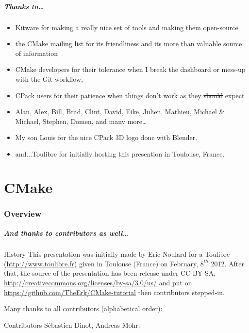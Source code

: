 \documentclass[compress,slidestop,table
              ]
               {beamer}
\begin{document}
\begin{frame}
\frametitle{Thanks to\ldots}
\begin{itemize}
\item \textcolor{cmakeblue}{Kitware for making a really nice set of tools and making them open-source}
\item \textcolor{cmakered}{the CMake mailing list for its friendliness and its more than valuable source of information}
\item \textcolor{cmakegreen}{CMake developers for their tolerance when I break the dashboard or mess-up
      with the Git workflow,}
\item \textcolor{cmakeblue}{CPack users for their patience when things don't work as they \sout{should} expect}
\item \textcolor{cmakeblue}{Alan},
      \textcolor{cmakered}{Alex},
      \textcolor{cmakegreen}{Bill},
      \textcolor{cmakeblue}{Brad},
      \textcolor{cmakered}{Clint},
      \textcolor{cmakegreen}{David},
      \textcolor{cmakeblue}{Eike},
      \textcolor{cmakered}{Julien},
      \textcolor{cmakegreen}{Mathieu},
      \textcolor{cmakeblue}{Michael \& Michael},
      \textcolor{cmakered}{Stephen},
      \textcolor{cmakegreen}{Domen},
      \textcolor{cmakeblue}{and}  \textcolor{cmakered}{many} \textcolor{cmakegreen}{more}\ldots
\item \textcolor{cmakegreen}{My son Louis for the nice CPack 3D logo done with Blender.}
\item \textcolor{cmakered}{and...Toulibre for initially hosting this presention in Toulouse, France.}
\end{itemize}
\end{frame}

\part{CMake}

\section{Overview}

\begin{frame}
\frametitle{And thanks to contributors as well\ldots}

{%
\begin{block}{History}
\fontsize{9pt}{11}\selectfont
This presentation  was initially made  by Eric Noulard for  a Toulibre
(\url{http://www.toulibre.fr}) given in Toulouse (France) on February,
$8^{th}$ 2012.  After that,  the source of  the presentation  has been
release                         under                        CC-BY-SA,
\url{http://creativecommons.org/licenses/by-sa/3.0/us/} and put on
\url{https://github.com/TheErk/CMake-tutorial} then contributors
stepped-in.
\end{block}
{\normalsize
Many thanks to all contributors (alphabetical order):
}
\begin{block}{Contributors}
 \fontsize{9pt}{11}\selectfont
 \textcolor{cmakeblue}{Sébastien Dinot},
 \textcolor{cmakered}{Andreas Mohr}.
\end{block}
}
\end{frame}
\end{document}
